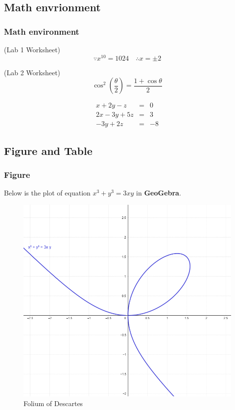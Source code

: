 \documentclass{beamer}
\begin{document}
\subsection{Math envrionment}
\begin{frame}
\frametitle{Math environment}

(Lab 1 Worksheet)\\
\[
\because x^{10} = 1024 \quad \therefore x=\pm 2
\]

\pause

(Lab 2 Worksheet)\\
\begin{equation}
\cos^2 \left(\frac{\theta}{2}\right) = \frac{1+\cos\theta}{2}
\end{equation}

\pause

\begin{eqnarray}
x+2y-z &=& 0 \nonumber \\
2x-3y+5z &=& 3 \\
-3y + 2z &=& -8
\end{eqnarray}

\end{frame}

\subsection{Figure and Table}
\begin{frame}
\frametitle{Figure}
Below is the plot of equation $x^3+y^3=3xy$ in \textbf{GeoGebra}.
\pause
\begin{figure}
\includegraphics[scale=0.3]{eqnfig}
\caption{Folium of Descartes}
\label{fig1}
\end{figure}

\end{frame}
\end{document}
